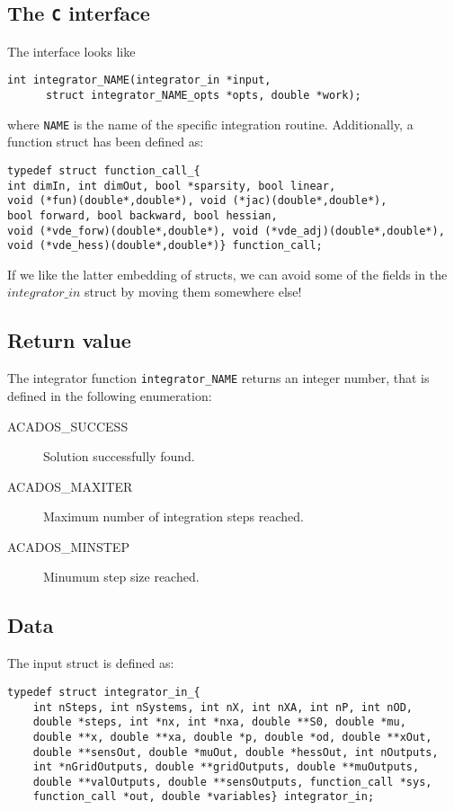 \documentclass{report}
\begin{document}
\subsection{The \texttt{C} interface}
The interface looks like
\begin{verbatim}
int integrator_NAME(integrator_in *input, 
      struct integrator_NAME_opts *opts, double *work);
\end{verbatim}
where \texttt{NAME} is the name of the specific integration routine. Additionally, a function struct has been defined as:
\begin{verbatim}
typedef struct function_call_{
int dimIn, int dimOut, bool *sparsity, bool linear, 
void (*fun)(double*,double*), void (*jac)(double*,double*), 
bool forward, bool backward, bool hessian,
void (*vde_forw)(double*,double*), void (*vde_adj)(double*,double*),
void (*vde_hess)(double*,double*)} function_call;
\end{verbatim}
If we like the latter embedding of structs, we can avoid some of the fields in the $integrator\_in$ struct by moving them somewhere else!

\subsection{Return value}
The integrator function \texttt{integrator\_NAME} returns an integer number, that is defined in the following enumeration:
\begin{description}
	\item[ACADOS\_SUCCESS] Solution successfully found.
	\item[ACADOS\_MAXITER] Maximum number of integration steps reached.
	\item[ACADOS\_MINSTEP] Minumum step size reached.
\end{description}

\subsection{Data}
The input struct is defined as:
\begin{verbatim}
typedef struct integrator_in_{
    int nSteps, int nSystems, int nX, int nXA, int nP, int nOD, 
    double *steps, int *nx, int *nxa, double **S0, double *mu,
    double **x, double **xa, double *p, double *od, double **xOut, 
    double **sensOut, double *muOut, double *hessOut, int nOutputs,
    int *nGridOutputs, double **gridOutputs, double **muOutputs, 
    double **valOutputs, double **sensOutputs, function_call *sys, 
    function_call *out, double *variables} integrator_in;
\end{verbatim}
\end{document}
